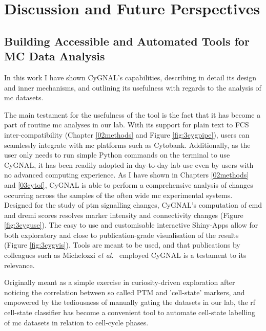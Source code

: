 \chapter{Discussion and Future Perspectives}
\label{07disc}

\section{Building Accessible and Automated Tools for MC Data Analysis}

In this work I have shown CyGNAL's capabilities, describing in detail its design and inner mechanisms, and outlining its usefulness with regards to the analysis of \acrshort{mc} datasets.

The main testament for the usefulness of the tool is the fact that it has become a part of routine \acrshort{mc} analyses in our lab. With its support for plain text to FCS inter-compatibility (Chapter \ref{02methods} and Figure \ref{fig:3cygpipe}), users can seamlessly integrate with \acrshort{mc} platforms such as Cytobank. Additionally, as the user only needs to run simple Python commands on the terminal to use CyGNAL, it has been readily adopted in day-to-day lab use even by users with no advanced computing experience. 
As I have shown in Chapters \ref{02methods} and \ref{03cytof}, CyGNAL is able to perform a comprehensive analysis of changes occurring across the samples of the often wide \acrshort{mc} experimental systems. Designed for the study of \acrshort{ptm} signalling changes, CyGNAL's computation of \acrshort{emd} and \acrshort{dremi} scores resolves marker intensity and connectivity changes (Figure \ref{fig:3cyguse}). The easy to use and customisable interactive Shiny-Apps allow for both exploratory and close to publication-grade visualisation of the results (Figure \ref{fig:3cygvis}). Tools are meant to be used, and that publications by colleagues such as Michelozzi \emph{et al}.~\cite{michelozzi_activation_2023} employed CyGNAL is a testament to its relevance.

Originally meant as a simple exercise in curiosity-driven exploration after noticing the correlation between so called PTM and 'cell-state' markers, and empowered by the tediousness of manually gating the datasets in our lab, the \acrshort{rf} cell-state classifier has become a convenient tool to automate cell-state labelling of \acrshort{mc} datasets in relation to cell-cycle phases.

